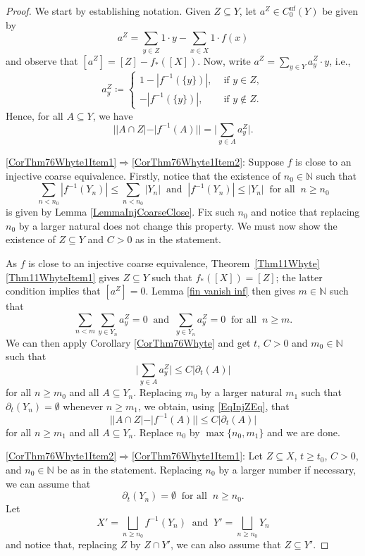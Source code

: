\documentclass[11pt]{amsart}
\newcommand{\N}{\mathbb{N}}
\numberwithin{equation}{section}
\theoremstyle{definition}
\theoremstyle{remark}
\numberwithin{equation}{section}
\begin{document}
\begin{proof}
We start by establishing notation. Given $Z\subseteq Y$, let $a^Z\in C_0^{\textrm{uf}}(Y)$ be given by \[a^Z=\sum_{y\in Z}1\cdot y-\sum_{x\in X}1\cdot f(x)\] and observe that $[a^Z]=[Z]-f_*([X])$. Now, write $a^Z=\sum_{y\in Y}a^Z_y\cdot y$, i.e., 
\begin{equation*}\label{EqFormulaAy}
a^Z_y\coloneqq \left\{\begin{array}{ll}
1-|f^{-1}(\{y\})|,& \text{ if } y\in Z,\\ 
-|f^{-1}(\{y\})|,& \text{ if } y \not\in Z.
\end{array}\right.
\end{equation*}
Hence, for all $A\subseteq Y$, we have 
 \begin{equation}\label{EqInjZEq}
 ||A\cap Z|-|f^{-1}(A)||= \Bigg|\sum_{y\in A}a^Z_y\Bigg|.
\end{equation}

 \eqref{CorThm76Whyte1Item1}$\Rightarrow$\eqref{CorThm76Whyte1Item2}: Suppose $f$ is close to an injective coarse equivalence. Firstly, notice that the existence of $n_0\in \N$ such that \[\sum_{n<n_0}|f^{-1}(Y_n)|\leq \sum_{n<n_0}|Y_n| \ \text{ and } \ |f^{-1}(Y_n)|\leq |Y_{n}|\ \text{ for all } \ n\geq n_0\]
 is given by Lemma \ref{LemmaInjCoarseClose}. Fix such $n_0$ and notice that replacing $n_0$ by a larger natural does not change this property. We must now show the existence of $Z\subseteq Y$ and $C>0$ as in the statement.
 
As $f$ is close to an injective coarse equivalence, Theorem~\ref{Thm11Whyte}\eqref{Thm11WhyteItem1} gives $Z\subseteq Y$ such that $f_*([X])=[Z]$; the latter condition implies that $[a^Z]=0$. Lemma \ref{fin vanish inf} then gives $m\in\N$ such that 
\[
\sum_{n<m}\sum_{y\in Y_n}a^Z_y=0\ \text{ and }\ \sum_{y\in Y_n}a^Z_y=0\ \text{ for all }\ n\geq m.
\]
We can then apply Corollary \ref{CorThm76Whyte} and get  $t$, $C>0$ and $m_0\in \N$ such that 
 \[
 \Bigg|\sum_{y\in A}a^Z_y\Bigg|\leq C|\partial_{t}(A)|
 \]
 for all $n\geq m_0$ and all $A\subseteq Y_n$. Replacing $m_0$ by a larger natural $m_1$ such that $\partial_t(Y_n)=\emptyset$ whenever $n\geq m_1$, we obtain, using \eqref{EqInjZEq}, that 
 \[
 ||A\cap Z|-|f^{-1}(A)|| \leq C|\partial_{t}(A)|
 \]
for all $n\geq m_1$ and all $A\subseteq Y_n$. Replace $n_0$ by $\max \{n_0,m_1\}$ and we are done.
 
 \eqref{CorThm76Whyte1Item2}$\Rightarrow$\eqref{CorThm76Whyte1Item1}: Let $Z\subseteq X$, $t\geq t_0$, $C>0$, and $n_0\in\N$ be as in the statement. Replacing $n_0$ by a larger number if necessary, we can assume that 
 \begin{equation}\label{Eq08Jun20231}
 \partial_{t}(Y_n)=\emptyset\ \text{ for all } \ n\geq n_0.
\end{equation}
 Let \[X'=\bigsqcup_{n\geq n_0}f^{-1}(Y_n)\ \text{ and }\ Y'=\bigsqcup_{n\geq n_0}Y_n\] and notice that, replacing $Z$ by $Z\cap Y'$, we can also assume that $Z\subseteq Y'$. 


\end{proof}
\end{document}
